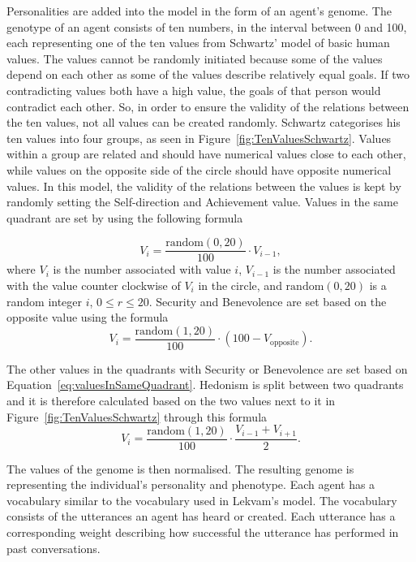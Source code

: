 Personalities are added into the model in the form of an agent’s genome. The genotype of an agent consists of ten numbers, in the interval between 0 and 100, each representing one of the ten values from Schwartz' model of basic human values. The values cannot be randomly initiated because some of the values depend on each other as some of the values describe relatively equal goals. If two contradicting values both have a high value, the goals of that person would contradict each other. So, in order to ensure the validity of the relations between the ten values, not all values can be created randomly. Schwartz categorises his ten values into four groups, as seen in Figure~\ref{fig:TenValuesSchwartz}. Values within a group are related and should have numerical values close to each other, while values on the opposite side of the circle should have opposite numerical values. In this model, the validity of the relations between the values is kept by randomly setting the Self-direction and Achievement value. Values in the same quadrant are set by using the following formula

\begin{equation}\label{eq:valuesInSameQuadrant}
V_{i} = \frac{\mathrm{random}(0, 20)}{100} \cdot V_{i-1},
\end{equation}
where $V_{i}$ is the number associated with value $i$, $V_{i-1}$ is the number associated with the value counter clockwise of $V_i$ in the circle, and $\mathrm{random}(0, 20)$ is a random integer $i$, $0 \leq r \leq 20$. Security and Benevolence are set based on the opposite value using the formula
\begin{equation}\label{eq:valuesInOppositeQuadrant}
V_{i} = \frac{\mathrm{random}(1, 20)}{100} \cdot (100 - V_{\mathrm{opposite}}).
\end{equation}

The other values in the quadrants with Security or Benevolence are set based on Equation~\eqref{eq:valuesInSameQuadrant}. Hedonism is split between two quadrants and it is therefore calculated based on the two values next to it in Figure~\ref{fig:TenValuesSchwartz} through this formula
\begin{equation}\label{eq:hedonism}
V_{i} = \frac{\mathrm{random}(1, 20)}{100} \cdot \frac{V_{i-1} + V_{i+1}}{2}.
\end{equation}

The values of the genome is then normalised. The resulting genome is representing the individual’s personality and phenotype.  Each agent has a vocabulary similar to the vocabulary used in Lekvam’s model. The vocabulary consists of the utterances an agent has heard or created. Each utterance has a corresponding weight describing how successful the utterance has performed in past conversations.


